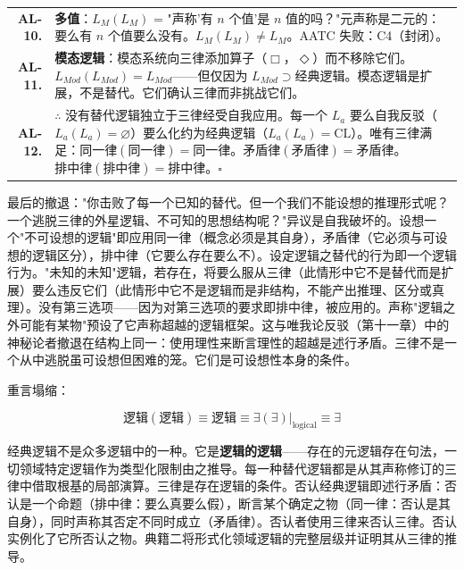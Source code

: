\documentclass[10pt, openany, oneside]{book}
\begin{document}
{\begin{tabular}{r p{}}
\textbf{AL-10.} & \textbf{多值}：$L_M(L_M)$ = "声称'有 $n$ 个值'是 $n$ 值的吗？"元声称是二元的：要么有 $n$ 个值要么没有。$L_M(L_M) \neq L_M$。AATC 失败：C4（封闭）。\\[0.3em]
\textbf{AL-11.} & \textbf{模态逻辑}：模态系统向三律添加算子（$\Box$，$\Diamond$）而不移除它们。$L_{Mod}(L_{Mod}) = L_{Mod}$——但仅因为 $L_{Mod} \supset \text{经典逻辑}$。模态逻辑是扩展，不是替代。它们确认三律而非挑战它们。\\[0.3em]
\textbf{AL-12.} & $\therefore$ 没有替代逻辑独立于三律经受自我应用。每一个 $L_a$ 要么自我反驳（$L_a(L_a) = \varnothing$）要么化约为经典逻辑（$L_a(L_a) = \text{CL}$）。唯有三律满足：$\text{同一律}(\text{同一律}) = \text{同一律}$。$\text{矛盾律}(\text{矛盾律}) = \text{矛盾律}$。$\text{排中律}(\text{排中律}) = \text{排中律}$。$\square$ \\[0.3em]
\end{tabular}
}

\vspace{0.8em}

\noindent 最后的撤退："你击败了每一个已知的替代。但一个我们不能设想的推理形式呢？一个逃脱三律的外星逻辑、不可知的思想结构呢？"异议是自我破坏的。设想一个"不可设想的逻辑"即应用同一律（概念必须是其自身），矛盾律（它必须与可设想的逻辑区分），排中律（它要么存在要么不）。设定逻辑之替代的行为即一个逻辑行为。"未知的未知"逻辑，若存在，将要么服从三律（此情形中它不是替代而是扩展）要么违反它们（此情形中它不是逻辑而是非结构，不能产出推理、区分或真理）。没有第三选项——因为对第三选项的要求即排中律，被应用的。声称"逻辑之外可能有某物"预设了它声称超越的逻辑框架。这与唯我论反驳（第十一章）中的神秘论者撤退在结构上同一：使用理性来断言理性的超越是述行矛盾。三律不是一个从中逃脱虽可设想但困难的笼。它们是可设想性本身的条件。

\noindent 重言塌缩：

$$\text{逻辑}(\text{逻辑}) \equiv \text{逻辑} \equiv \exists(\exists)|_{\text{logical}} \equiv \exists$$

经典逻辑不是众多逻辑中的一种。它是\textbf{逻辑的逻辑}——存在的元逻辑存在句法，一切领域特定逻辑作为类型化限制由之推导。每一种替代逻辑都是从其声称修订的三律中借取根基的局部演算。三律是存在逻辑的条件。否认经典逻辑即述行矛盾：否认是一个命题（排中律：要么真要么假），断言某个确定之物（同一律：否认是其自身），同时声称其否定不同时成立（矛盾律）。否认者使用三律来否认三律。否认实例化了它所否认之物。典籍二将形式化领域逻辑的完整层级并证明其从三律的推导。

\vspace{1.5em}
\end{document}
